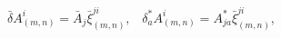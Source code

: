 \begin{equation*}
\bar{\delta}A_{(m,n)}^{i}=\bar{A}_{j}\bar{\xi}_{(m,n)}^{ji},\;\;\;\delta
_{a}^{\ast }A_{(m,n)}^{i}=A_{ja}^{\ast }\bar{\xi}_{(m,n)}^{ji},
\end{equation*}

